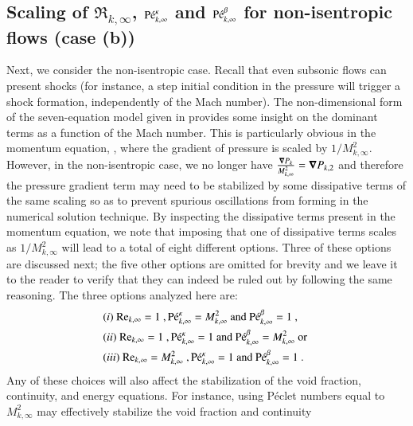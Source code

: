 \documentclass[preprint,10pt]{elsarticle}
\begin{document}
{%
\subsection{Scaling of $\Re_{k,\infty}$, $\textrm{P\'e}_{k,\infty}^\kappa$ and $\textrm{P\'e}_{k,\infty}^\beta$ for non-isentropic flows (case (b))}\label{eq:non_isent_flows}
Next, we consider the non-isentropic case. Recall that even subsonic flows can present shocks (for instance, 
a step initial condition in the pressure will trigger a shock formation, independently of the Mach number). 
The non-dimensional form of the seven-equation model given in  provides some insight on the 
dominant terms as a function of the Mach number. This is particularly obvious in the momentum equation, , 
where the gradient of pressure is scaled by $1/M_{k,\infty}^2$. However, in the non-isentropic case, we no longer 
have $\frac{\boldsymbol\nabla P_k}{M_{k,\infty}^2}=\boldsymbol\nabla P_{k,2}$ and therefore the pressure gradient term may need to be stabilized by 
some dissipative terms of the same scaling so as to prevent spurious oscillations from forming in the numerical solution technique. 
By inspecting the dissipative terms present in the momentum equation, we note that imposing that one of dissipative terms 
scales as $1/M_{k,\infty}^2$ will lead to a total of eight different options. Three of these options are discussed next; the five other 
options are omitted for brevity and we leave it to the reader to verify that they can indeed be ruled out by following the same reasoning. The three options analyzed here are:
%
\begin{align}
&(i) \ \textrm{Re}_{k,\infty} = 1 \ , \textrm{P\'e}_{k,\infty}^\kappa = M_{k,\infty}^2 \text{ and } \textrm{P\'e}_{k,\infty}^\beta = 1 \ , \nonumber \\
&(ii) \ \textrm{Re}_{k,\infty} = 1 \ , \textrm{P\'e}_{k,\infty}^\kappa = 1 \text{ and } \textrm{P\'e}_{k,\infty}^\beta = M_{k,\infty}^2 \text{ or } \nonumber \\
&(iii) \ \textrm{Re}_{k,\infty} = M_{k,\infty}^2 \ , \textrm{P\'e}_{k,\infty}^\kappa = 1 \text{ and } \textrm{P\'e}_{k,\infty}^\beta = 1 \ . \nonumber
\end{align}
%
Any of these choices will also affect the stabilization of the void fraction, continuity, and energy equations. 
For instance, using P\'eclet numbers equal to $M_{k,\infty}^2$ may effectively stabilize the void fraction and continuity 
}
\end{document}
